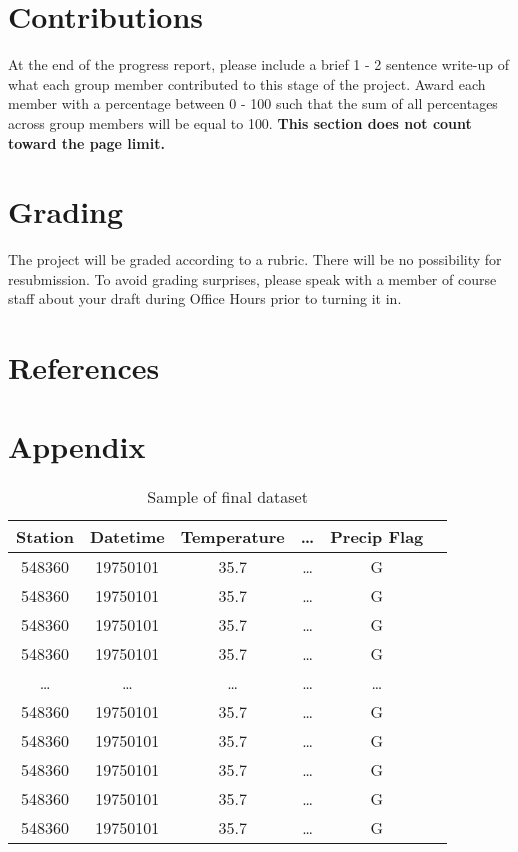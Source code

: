 \documentclass[conference]{IEEEtran}
\begin{document}
\section{Contributions}

At the end of the progress report, please include a brief 1 - 2 sentence write-up of what each group member contributed to this stage of the project. Award each member with a percentage between 0 - 100 such that the sum of all percentages across group members will be equal to 100. \textbf{This section does not count toward the page limit.}

\section{Grading}

The project will be graded according to a rubric. There will be no possibility for resubmission. To avoid grading surprises, please speak with a member of course staff about your draft during Office Hours prior to turning it in.

\section{References}

\section{Appendix}

\begin{table}[h!]
\centering
 \begin{tabular}{||c c c c c c||}
 \hline
  Station& Datetime &Temperature & \dots & Precip Flag \\ [0.5ex]
 \hline\hline
 548360 & 19750101 & 35.7 & \dots & G \\
 548360 & 19750101 & 35.7 & \dots & G \\
 548360 & 19750101 & 35.7 & \dots & G \\
 548360 & 19750101 & 35.7 & \dots & G \\
 \dots & \dots & \dots & \dots & \dots \\
 548360 & 19750101 & 35.7 & \dots & G \\
 548360 & 19750101 & 35.7 & \dots & G \\
 548360 & 19750101 & 35.7 & \dots & G \\
 548360 & 19750101 & 35.7 & \dots & G \\
 548360 & 19750101 & 35.7 & \dots & G \\[1ex]

 \hline
 \end{tabular}
 \caption{Sample of final dataset}
\end{table}
\end{document}
